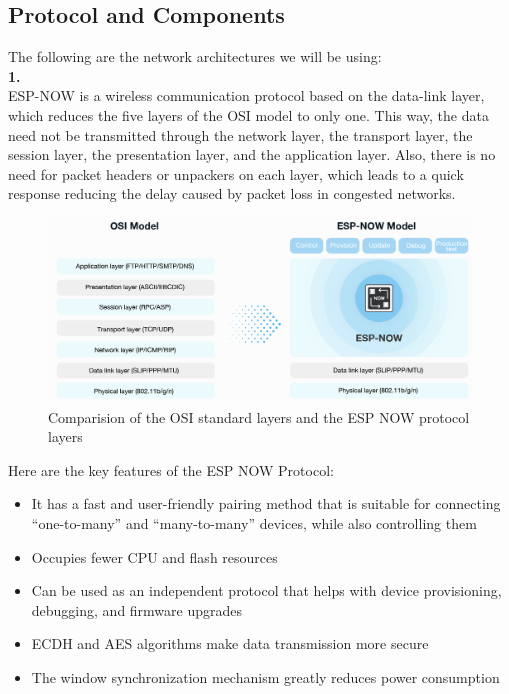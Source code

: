 \subsection{Protocol and Components}
The following are the network architectures we will be using: \\
\textbf{1. } \\
ESP-NOW is a wireless communication protocol based on the data-link layer, which reduces the five layers of the OSI model to only one. This way, the data need not be transmitted through the network layer, the transport layer, the session layer, the presentation layer, and the application layer. Also, there is no need for packet headers or unpackers on each layer, which leads to a quick response reducing the delay caused by packet loss in congested networks. 
\begin{figure}[H]
    \centering
    \includegraphics[width=0.75\linewidth]{Files/Images/model-en.png}
    \caption{Comparision of the OSI standard layers and the ESP NOW protocol layers}
    \label{fig:enter-label}
\end{figure}
Here are the key features of the ESP NOW Protocol:
\begin{itemize}
    \item It has a fast and user-friendly pairing method that is suitable for connecting “one-to-many” and “many-to-many” devices, while also controlling them
    \item Occupies fewer CPU and flash resources
    \item Can be used as an independent protocol that helps with device provisioning, debugging, and firmware upgrades
    \item  ECDH and AES algorithms make data transmission more secure
    \item The window synchronization mechanism greatly reduces power consumption
\end{itemize}
